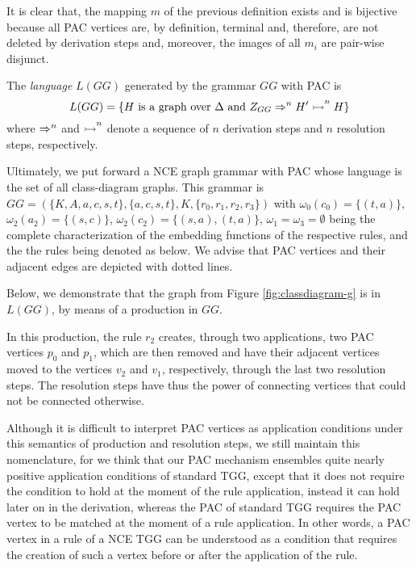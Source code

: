 It is clear that, the mapping $m$ of the previous definition exists and is bijective because all PAC vertices are, by definition, terminal and, therefore, are not deleted by derivation steps and, moreover, the images of all $m_i$ are pair-wise disjunct.

\begin{definition}
	The \emph{language} $L(GG)$ generated by the grammar $GG$ with PAC is
	\begin{equation*}
		L(GG) = \{ H \text{ is a graph over } \Delta \text{ and } Z_{GG} \Rightarrow^{n}_{} H' \overset{}{\rightarrowtail}^{n} H \}
	\end{equation*}
	where $\Rightarrow^{n}_{}$ and $\overset{}{\rightarrowtail}^{n}$ denote a sequence of $n$ derivation steps and $n$ resolution steps, respectively.
\end{definition}

Ultimately, we put forward a NCE graph grammar with PAC whose language is the set of all class-diagram graphs. This grammar is $GG = (\{K, A, a, c, s, t\}, \{a, c, s, t\}, K, \{r_0, r_1, r_2, r_3\})$ with $\omega_0(c_0) = \{(t,a)\}$, $\omega_2(a_2) = \{(s,c)\}$, $\omega_2(c_2) = \{(s,a),(t,a)\}$, $\omega_1 = \omega_3 = \emptyset$ being the complete characterization of the embedding functions of the respective rules, and the the rules being denoted as below. We advise that PAC vertices and their adjacent edges are depicted with dotted lines.



Below, we demonstrate that the graph from Figure \ref{fig:classdiagram-g} is in $L(GG)$, by means of a production in $GG$.



In this production, the rule $r_2$ creates, through two applications, two PAC vertices $p_0$ and $p_1$, which are then removed and have their adjacent vertices moved to the vertices $v_2$ and $v_1$, respectively, through the last two resolution steps. The resolution steps have thus the power of connecting vertices that could not be connected otherwise.

Although it is difficult to interpret PAC vertices as application conditions under this semantics of production and resolution steps, we still maintain this nomenclature, for we think that our PAC mechanism ensembles quite nearly positive application conditions of standard TGG, except that it does not require the condition to hold at the moment of the rule application, instead it can hold later on in the derivation, whereas the PAC of standard TGG requires the PAC vertex to be matched at the moment of a rule application. In other words, a PAC vertex in a rule of a NCE TGG can be understood as a condition that requires the creation of such a vertex before or after the application of the rule.

